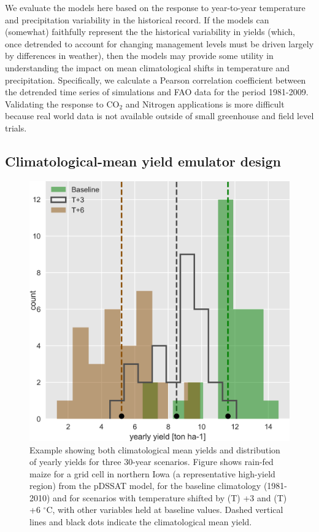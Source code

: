 \documentclass[preprint, 5p, times, twocolumn]{elsarticle}
\begin{document}
{We evaluate the models here based on the response to year-to-year temperature and precipitation variability in the historical record. If the models can (somewhat) faithfully represent the the historical variability in yields (which, once detrended to account for changing management levels must be driven largely by differences in weather), then the models may provide some utility in understanding the impact on mean climatological shifts in temperature and precipitation. Specifically, we calculate a Pearson correlation coefficient between the detrended time series of simulations and FAO data for the period 1981-2009. Validating the response to CO$_2$ and Nitrogen applications is more difficult because real world data is not available outside of small greenhouse and field level trials.

\subsection{Climatological-mean yield emulator design}
\begin{figure}[!h]
\centering
   \includegraphics[width=0.95\linewidth]{figures/hist_year.png}
   \caption{Example showing both climatological mean yields and distribution of yearly yields for three 30-year scenarios. Figure shows rain-fed maize for a grid cell in northern Iowa (a representative high-yield region) from the pDSSAT model, for the baseline climatology (1981-2010) and for scenarios with temperature shifted by (T) +3 and (T) +6 $^{\circ}$C, with other variables held at baseline values. Dashed vertical lines and black dots indicate the climatological mean yield.}
   \label{fig:yearly}
\end{figure}

}
\end{document}
